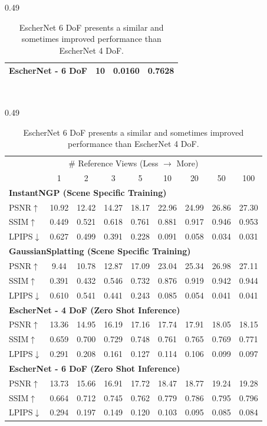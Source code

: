 \documentclass[10pt,twocolumn,letterpaper]{article}
\begin{document}
\begin{table}[ht!]
\begin{subtable}{0.49\linewidth}
\begin{tabular}{lccc}
    EscherNet - 6 DoF & 10 &0.0160&0.7628 \\
     \bottomrule
   \end{tabular}
   \caption{{\bf 3D reconstruction performance on GSO.} }
   \label{tab:3D_6DoF}
    \end{subtable}\\
    \begin{subtable}{0.49\linewidth}
    \centering
    \setlength{\tabcolsep}{0.45em}
       \begin{tabular}{lcccccccc}
       \toprule
        \multicolumn{9}{c}{\# Reference Views (Less $\to$ More)} \\
         & 1 & 2 & 3 & 5 & 10 & 20 & 50 & 100 \\
        \midrule 
        \multicolumn{9}{l}{{\bf InstantNGP (Scene Specific Training)}} \\
         PSNR$\uparrow$ & 10.92 & 12.42& 14.27& 18.17& 22.96& 24.99& 26.86& 27.30 \\
        SSIM$\uparrow$  & 0.449 & 0.521& 0.618& 0.761& 0.881& 0.917& 0.946& 0.953\\
        LPIPS$\downarrow$  & 0.627 & 0.499& 0.391& 0.228& 0.091& 0.058& 0.034& 0.031 \\
        \midrule 
        \multicolumn{9}{l}{{\bf GaussianSplatting (Scene Specific Training)}} \\
         PSNR$\uparrow$ & 9.44 & 10.78& 12.87& 17.09& 23.04& 25.34& 26.98& 27.11 \\
        SSIM$\uparrow$  & 0.391 & 0.432& 0.546& 0.732& 0.876& 0.919& 0.942& 0.944\\
        LPIPS$\downarrow$  & 0.610 & 0.541& 0.441& 0.243& 0.085& 0.054& 0.041& 0.041 \\
        \midrule 
        \multicolumn{9}{l}{{\bf EscherNet - 4 DoF (Zero Shot Inference)}} \\
        PSNR$\uparrow$  & 13.36 & 14.95& 16.19& 17.16& 17.74& 17.91& 18.05& 18.15 \\
        SSIM$\uparrow$   & 0.659 & 0.700& 0.729& 0.748& 0.761& 0.765& 0.769& 0.771\\
        LPIPS$\downarrow$  & 0.291 & 0.208& 0.161& 0.127& 0.114& 0.106& 0.099& 0.097\\
        \midrule 
        \multicolumn{9}{l}{{\bf EscherNet - 6 DoF (Zero Shot Inference)}} \\
        PSNR$\uparrow$  & 13.73 & 15.66& 16.91& 17.72& 18.47& 18.77& 19.24& 19.28 \\
        SSIM$\uparrow$  & 0.664 & 0.712& 0.745& 0.762& 0.779& 0.786& 0.795& 0.796\\
        LPIPS$\downarrow$ & 0.294 & 0.197& 0.149&0.120& 0.103& 0.095& 0.085& 0.084\\
        \bottomrule
   \end{tabular}
   \caption{{\bf Novel view synthesis performance on NeRF Synthetic dataset.}}
   \label{tab:nerf_6DoF}
   \end{subtable}
   \caption{EscherNet 6 DoF presents a similar and sometimes improved performance than EscherNet 4 DoF.}
\end{table}
\end{document}
